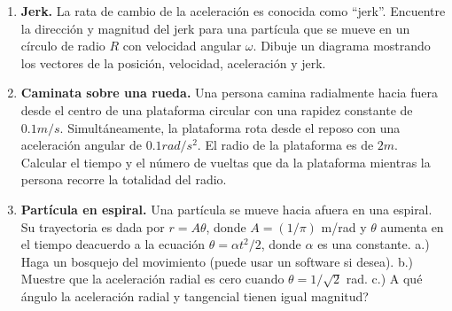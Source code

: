 \documentclass[11pt,letterpaper]{article}
\begin{document}
\begin{multicols}{2}
\begin{enumerate}
		
		

		\item \textbf{Jerk.} La rata de cambio de la aceleración es conocida como ``jerk''. Encuentre la dirección y magnitud del jerk para una partícula que se mueve en un círculo de radio $R$ con velocidad angular $\omega$. Dibuje un diagrama mostrando los vectores de la posición, velocidad, aceleración y jerk.
		
		\item \textbf{Caminata sobre una rueda.} Una persona camina radialmente hacia fuera desde el centro de una plataforma circular con una rapidez constante de $0.1 m/s$. Simultáneamente, la plataforma rota desde el reposo con una aceleración angular de $0.1 rad/s^2$. El radio de la plataforma es de $2 m$. Calcular el tiempo y el número de vueltas que da la plataforma mientras la persona recorre la totalidad del radio.
		
		\item \textbf{Partícula en espiral.} Una partícula se mueve hacia afuera en una espiral. Su trayectoria es dada por $r=A\theta$, donde $A= (1/\pi)$ m/rad y $\theta$ aumenta en el tiempo deacuerdo a la ecuación $\theta = \alpha t^2/2$, donde $\alpha$ es una constante. a.) Haga un bosquejo del movimiento (puede usar un software si desea). b.) Muestre que la aceleración radial es cero cuando $\theta=1/\sqrt{2}$ rad. c.) \textquestiondown A qué ángulo la aceleración radial y tangencial tienen igual magnitud? 

		
		
		
	\end{enumerate}
	
	\end{multicols}
\end{document}

